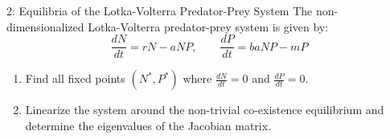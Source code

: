 \documentclass[12pt, a4paper]{article}
\newif\ifsolutions
\begin{document}
\begin{problembox}[50 Points]{2: Equilibria of the Lotka-Volterra Predator-Prey System}
The non-dimensionalized Lotka-Volterra predator-prey system is given by:
\begin{equation*}
    \frac{dN}{dt} = rN - aNP, \qquad \frac{dP}{dt} = baNP - mP
\end{equation*}
\begin{enumerate}[label=(\alph*)]
    \item Find all fixed points $(N^*, P^*)$ where $\frac{dN}{dt} = 0$ and $\frac{dP}{dt} = 0$.
    \item Linearize the system around the non-trivial co-existence equilibrium and determine the eigenvalues of the Jacobian matrix.
\end{enumerate}
\end{problembox}

\ifsolutions
\begin{solutionbox}
\textbf{Part (a):} Setting derivatives to zero:
\begin{align*}
    N(r - aP) &= 0 \implies N=0 \text{ or } P^* = \frac{r}{a} \\
    P(baN - m) &= 0 \implies P=0 \text{ or } N^* = \frac{m}{ba}
\end{align*}
Fixed points are $(0, 0)$ (extinction) and $(N^*, P^*) = \left(\frac{m}{ba}, \frac{r}{a}\right)$ (co-existence).

\textbf{Part (b):} The Jacobian matrix is:
\begin{equation*}
    \mathbf{J}(N, P) = \begin{pmatrix} r - aP & -aN \\ baP & baN - m \end{pmatrix}
\end{equation*}
Evaluated at $(N^*, P^*)$:
\begin{equation*}
    \mathbf{J}(N^*, P^*) = \begin{pmatrix} 0 & -\frac{am}{ba} \\ ba\frac{r}{a} & 0 \end{pmatrix} = \begin{pmatrix} 0 & -\frac{m}{b} \\ br & 0 \end{pmatrix}
\end{equation*}
The characteristic equation is $\det(\mathbf{J} - \lambda \mathbf{I}) = \lambda^2 + mr = 0 \implies \lambda = \pm i \sqrt{mr}$.
Since eigenvalues are purely imaginary, the non-trivial fixed point is a neutrally stable center surrounded by periodic closed orbits. \hfill $\blacksquare$
\end{solutionbox}
\fi
\end{document}
